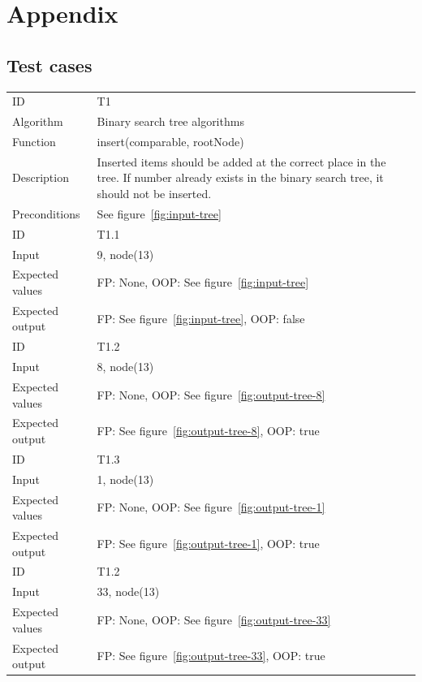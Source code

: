 \documentclass {article}
\begin{document}


\appendix
\section{Appendix}
\label{appendix:test-cases}
\subsection{Test cases}
\begin{tabular}{ | l p{10cm} | }
\hline
ID & T1 \\
Algorithm & Binary search tree algorithms \\
Function & insert(comparable, rootNode) \\
Description & Inserted items should be added at the correct place in the tree. If number already exists in the binary search tree, it should not be inserted. \\
Preconditions & See figure~\ref{fig:input-tree} \\
\hline
ID & T1.1 \\
Input & 9, node(13) \\
Expected values & FP: None, OOP: See figure~\ref{fig:input-tree} \\
Expected output & FP: See figure~\ref{fig:input-tree}, OOP: false \\
\hline
ID & T1.2 \\
Input & 8, node(13) \\
Expected values & FP: None, OOP: See figure~\ref{fig:output-tree-8} \\
Expected output & FP: See figure~\ref{fig:output-tree-8}, OOP: true \\
\hline
ID & T1.3 \\
Input & 1, node(13) \\
Expected values & FP: None, OOP: See figure~\ref{fig:output-tree-1} \\
Expected output & FP: See figure~\ref{fig:output-tree-1}, OOP: true \\
\hline
ID & T1.2 \\
Input & 33, node(13) \\
Expected values & FP: None, OOP: See figure~\ref{fig:output-tree-33} \\
Expected output & FP: See figure~\ref{fig:output-tree-33}, OOP: true \\
\hline
\end{tabular}
\end{document}
